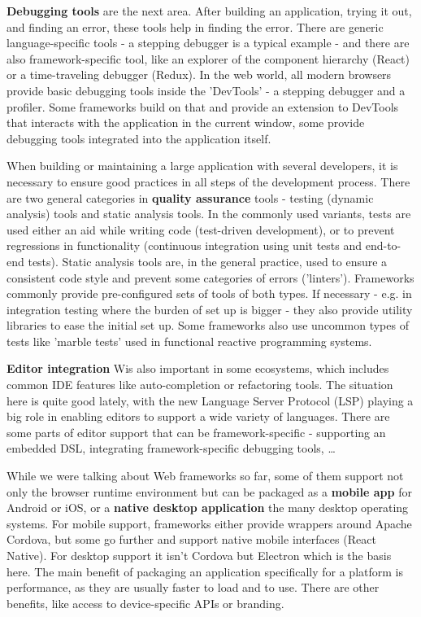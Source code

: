 \documentclass[english,odsaz]{fitthesis}
\begin{document}
\textbf{Debugging tools} are the next area. After building an application, trying it out,
and finding an error, these tools help in finding the error. There are generic
language-specific tools - a stepping debugger is a typical example - and there
are also framework-specific tool, like an explorer of the component hierarchy
(React) or a time-traveling debugger (Redux). In the web world, all modern
browsers provide basic debugging tools inside the 'DevTools' - a stepping
debugger and a profiler. Some frameworks build on that and provide an extension
to DevTools that interacts with the application in the current window, some
provide debugging tools integrated into the application itself.

When building or maintaining a large application with several developers, it is
necessary to ensure good practices in all steps of the development
process. There are two general categories in \textbf{quality assurance} tools - testing
(dynamic analysis) tools and static analysis tools. In the commonly used
variants, tests are used either an aid while writing code (test-driven
development), or to prevent regressions in functionality (continuous integration
using unit tests and end-to-end tests). Static analysis tools are, in the
general practice, used to ensure a consistent code style and prevent some
categories of errors ('linters'). Frameworks commonly provide pre-configured
sets of tools of both types. If necessary - e.g. in integration testing where
the burden of set up is bigger - they also provide utility libraries to ease the
initial set up. Some frameworks also use uncommon types of tests like 'marble
tests' used in functional reactive programming systems.

\textbf{Editor integration} Wis also important in some ecosystems, which includes common
IDE features like auto-completion or refactoring tools. The situation here is
quite good lately, with the new Language Server Protocol (LSP) playing a big
role in enabling editors to support a wide variety of languages. There are some
parts of editor support that can be framework-specific - supporting an embedded
DSL, integrating framework-specific debugging tools, \ldots{}

While we were talking about Web frameworks so far, some of them support not only
the browser runtime environment but can be packaged as a \textbf{mobile app} for Android
or iOS, or a \textbf{native desktop application} the many desktop operating systems. For
mobile support, frameworks either provide wrappers around Apache Cordova, but
some go further and support native mobile interfaces (React Native). For desktop
support it isn't Cordova but Electron which is the basis here. The main benefit
of packaging an application specifically for a platform is performance, as they
are usually faster to load and to use. There are other benefits, like access to
device-specific APIs or branding.
\end{document}
